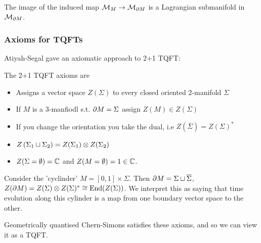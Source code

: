 \documentclass{article}
\begin{document}
\begin{theorem}
	The image of the induced map $\mathcal{M}_M \to \mathcal{M}_{\partial M}$ is a Lagrangian submanifold in $\mathcal{M}_{\partial M}$. 
\end{theorem}

\subsubsection{Axioms for TQFTs}
Atiyah-Segal gave an axiomatic approach to  2+1 TQFT: 
\begin{definition}
	The 2+1 TQFT axioms are 
	\begin{itemize}
		\item Assigns a vector space $Z(\Sigma)$ to every closed oriented 2-manifold $\Sigma$
		\item If $M$ is a 3-manfiodl s.t. $\partial M = \Sigma$ assign $Z(M) \in Z(\Sigma)$
		\item If you change the orientation you take the dual, i.e $Z(\bar{\Sigma}) = Z(\Sigma)^\ast$
		\item $Z\left( \Sigma_1 \sqcup \Sigma_2 \right) = Z(\Sigma_1) \otimes Z(\Sigma_2)$
		\item $Z(\Sigma = \emptyset)=\mathbb{C}$ and $Z(M=\emptyset) = 1 \in \mathbb{C}$. 
	\end{itemize}
\end{definition}

\begin{example}
	Consider the 'cyclinder' $M = [0,1] \times \Sigma$. Then $\partial M = \Sigma \sqcup \overline{\Sigma}$, $Z(\partial M) = Z(\Sigma) \otimes Z(\Sigma)^\ast \cong \operatorname{End}(Z(\Sigma))$. We interpret this as saying that time evolution along this cylinder is a map from one boundary vector space to the other.
\end{example}
Geometrically quantised Chern-Simons satisfies these axioms, and so we can view it as a TQFT. 



\end{document}
